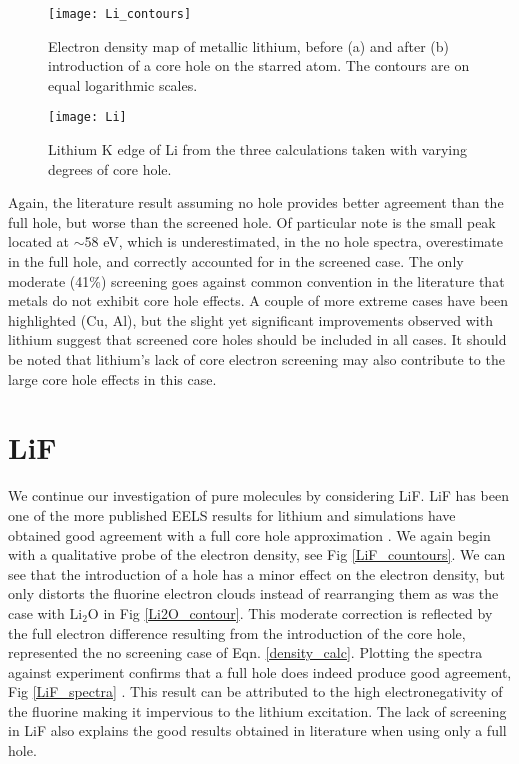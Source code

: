 \begin{figure}
	\centering
	\texttt{[image: Li\_contours]}
	\caption{Electron density map of metallic lithium, before (a) and after (b) introduction of a core hole on the starred atom.  The contours are on equal logarithmic scales.}
	\label{Li_countours}
\end{figure}




\begin{figure}
	\centering
	\texttt{[image: Li]}
	\caption{Lithium K edge of Li from the three calculations taken with varying degrees of core hole. }
	\label{Li_spectra}
\end{figure}


Again, the literature result assuming no hole provides better agreement than the full hole, but worse than the screened hole.  Of particular note is the small peak located at $ \sim$58 eV, which is underestimated, in the no hole spectra, overestimate in the full hole, and correctly accounted for in the screened case.  The only moderate (41\%) screening goes against common convention in the literature that metals do not exhibit core hole effects.  A couple of more extreme cases have been highlighted  (Cu, Al), but the slight yet significant improvements observed with lithium suggest that screened core holes should be included in all cases.  It should be noted that lithium's lack of core electron screening may also contribute to the large core hole effects in this case. 

\section{LiF}
We continue our investigation of pure molecules by considering LiF.  LiF has been one of the more published EELS results for lithium and simulations have obtained good agreement with a full core hole approximation \cite{mauchamp_ab_2006}.  We again begin with a qualitative probe of the electron density, see Fig \ref{LiF_countours}.  We can see that the introduction of a hole has a minor effect on the electron density, but only distorts the fluorine electron clouds instead of rearranging them as was the case with $ \mathrm{Li_2O}$ in Fig \ref{Li2O_contour}.  This moderate correction is reflected by the full electron difference resulting from the introduction of the core hole, represented the no screening case of Eqn. \ref{density_calc}.  Plotting the spectra against experiment confirms that a full hole does indeed produce good agreement, Fig \ref{LiF_spectra} .  This result can be attributed to the high electronegativity of the fluorine making it impervious to the lithium excitation.  The lack of screening in LiF also explains the good results obtained in literature when using only a full hole.  

